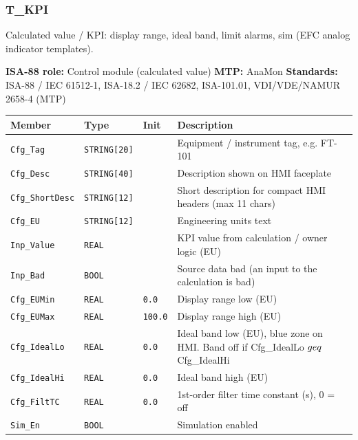 \subsubsection*{T\_KPI}
\label{app:pclib:tkpi}
Calculated value / KPI: display range, ideal band, limit alarms, sim (EFC analog indicator templates).

{\small\textbf{ISA-88 role:} Control module (calculated value) \quad \textbf{MTP:} AnaMon \quad \textbf{Standards:} ISA-88 /\allowbreak{} IEC 61512-1, ISA-18.2 /\allowbreak{} IEC 62682, ISA-101.01, VDI/\allowbreak{}VDE/\allowbreak{}NAMUR 2658-4 (MTP)}
{\footnotesize
\begin{longtable}{@{}>{\raggedright\arraybackslash}p{3.4cm}>{\raggedright\arraybackslash}p{3.3cm}>{\raggedright\arraybackslash}p{1.3cm}>{\raggedright\arraybackslash}p{6.4cm}@{}}
\toprule
\rowcolor{tblhead}\textbf{Member} & \textbf{Type} & \textbf{Init} & \textbf{Description} \\
\midrule
\endhead
\texttt{Cfg\_Tag} & \texttt{STRING[20]} &  & Equipment /\allowbreak{} instrument tag, e.g. FT-101 \\
\texttt{Cfg\_Desc} & \texttt{STRING[40]} &  & Description shown on HMI faceplate \\
\texttt{Cfg\_ShortDesc} & \texttt{STRING[12]} &  & Short description for compact HMI headers (max 11 chars) \\
\texttt{Cfg\_EU} & \texttt{STRING[12]} &  & Engineering units text \\
\texttt{Inp\_Value} & \texttt{REAL} &  & KPI value from calculation /\allowbreak{} owner logic (EU) \\
\texttt{Inp\_Bad} & \texttt{BOOL} &  & Source data bad (an input to the calculation is bad) \\
\texttt{Cfg\_EUMin} & \texttt{REAL} & \texttt{0.0} & Display range low (EU) \\
\texttt{Cfg\_EUMax} & \texttt{REAL} & \texttt{100.0} & Display range high (EU) \\
\texttt{Cfg\_IdealLo} & \texttt{REAL} & \texttt{0.0} & Ideal band low (EU), blue zone on HMI. Band off if Cfg\_IdealLo $\\geq$ Cfg\_IdealHi \\
\texttt{Cfg\_IdealHi} & \texttt{REAL} & \texttt{0.0} & Ideal band high (EU) \\
\texttt{Cfg\_FiltTC} & \texttt{REAL} & \texttt{0.0} & 1st-order filter time constant (s), 0 = off \\
\texttt{Sim\_En} & \texttt{BOOL} &  & Simulation enabled \\

\end{longtable}}
